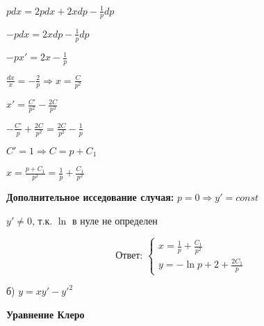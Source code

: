 \documentclass[a4paper]{article}
\begin{document}
$\displaystyle pdx=2pdx+2xdp-\frac{1}{p}dp$

\vspace{0.3cm}

$\displaystyle -pdx=2xdp-\frac{1}{p}dp$

\vspace{0.3cm}

$\displaystyle -px'=2x-\frac{1}{p}$

\vspace{0.3cm}

$\displaystyle \frac{dx}{x}=-\frac{2}{p} \Rightarrow x=\frac{C}{p^2}$

\vspace{0.3cm}

$\displaystyle x'=\frac{C'}{p^2}-\frac{2C}{p^3}$

\vspace{0.3cm}

$\displaystyle -\frac{C'}{p}+\frac{2C}{p^2}=\frac{2C}{p^2}-\frac{1}{p}$

\vspace{0.3cm}

$\displaystyle C'=1 \Rightarrow C=p+C_1$

\vspace{0.3cm}

$\displaystyle x=\frac{p+C_1}{p^2}=\frac{1}{p}+\frac{C_1}{p^2}$

\vspace{0.3cm}

\textbf{Дополнительное исседование случая:} $\displaystyle p=0 \Rightarrow y' =const$

$\displaystyle y'\neq0$, т.к. $\displaystyle \ln$ в нуле не определен

\vspace{0.3cm}

\begin{equation*}
\textbf{Ответ: }
\displaystyle \begin{cases}
\displaystyle x=\frac{1}{p}+\frac{C_1}{p^2}\\
\displaystyle y=-\ln{p}+2+\frac{2C_1}{p}
  \end{cases}
  \end{equation*}


\vspace{1cm}

б) $\displaystyle y=xy'-y'^{2}$

\vspace{0.3cm}

\textbf{Уравнение Клеро}

\vspace{0.3cm}
\end{document}
